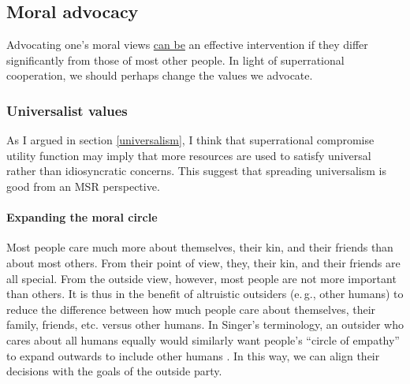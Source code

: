 \hypertarget{moral-advocacy}{\subsection{Moral
advocacy}\label{moral-advocacy}}

Advocating one's moral views
\href{http://www.utilitarian-essays.com/values-spreading.html}{can
be} an effective intervention if they differ significantly from those
of most other people. In light of superrational cooperation, we should
perhaps change the values we advocate.

\hypertarget{universalist-values}{\subsubsection{Universalist
values}\label{universalist-values}}

As I argued in section
\ref{universalism}, I think that
superrational compromise utility function may imply that more resources
are used to satisfy universal rather than idiosyncratic concerns. This
suggest that spreading universalism is good from an MSR perspective.

\paragraph{Expanding the moral circle}\label{expanding-the-moral-circle}

Most people care much more about themselves, their kin, and their
friends than about most others. From their point of view, they, their
kin, and their friends are all special. From the outside view, however,
most people are not more important than others. It is thus in the
benefit of altruistic outsiders (e.\,g., other humans) to reduce the
difference between how much people care about themselves, their family,
friends, etc. versus other humans. In Singer's
terminology, an outsider who cares
about all humans equally would similarly want people's ``circle of
empathy'' to expand outwards to include other humans \parencite{Singer2011-yx}. In this way, we
can align their decisions with the goals of the outside party.

